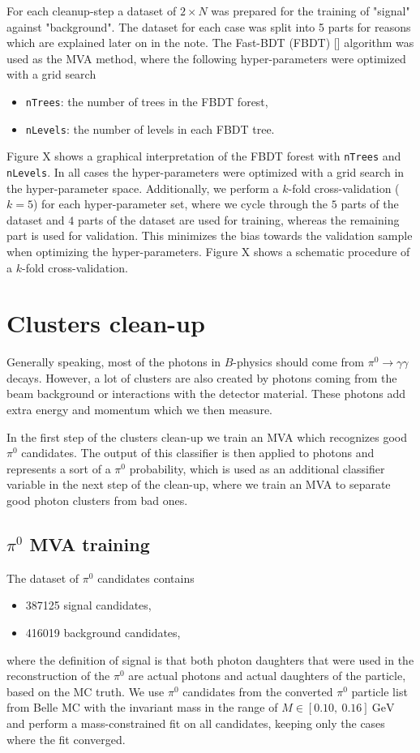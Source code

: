 \documentclass[oneside,a4paper,openany,12pt]{scrbook}
\newcommand {\e}[1]{\mathrm{~#1}}
\begin{document}
For each cleanup-step a dataset of $2\times N$ was prepared for the training of "signal" against "background". The dataset for each case was split into 5 parts for reasons which are explained later on in the note. The Fast-BDT (FBDT) [] algorithm was used as the MVA method, where the following hyper-parameters were optimized with a grid search
\begin{itemize}
\item \texttt{nTrees}: the number of trees in the FBDT forest,
\item \texttt{nLevels}: the number of levels in each FBDT tree.
\end{itemize}

Figure X shows a graphical interpretation of the FBDT forest with \texttt{nTrees} and \texttt{nLevels}. In all cases the hyper-parameters were optimized with a grid search in the hyper-parameter space. Additionally, we perform a $k$-fold cross-validation ($k=5$) for each hyper-parameter set, where we cycle through the $5$ parts of the dataset and $4$ parts of the dataset are used for training, whereas the remaining part is used for validation. This minimizes the bias towards the validation sample when optimizing the hyper-parameters. Figure X shows a schematic procedure of a $k$-fold cross-validation.

\section{Clusters clean-up}

Generally speaking, most of the photons in $B$-physics should come from $\pi^0 \to \gamma \gamma$ decays. However, a lot of clusters are also created by photons coming from the beam background or interactions with the detector material. These photons add extra energy and momentum which we then measure.

In the first step of the clusters clean-up we train an MVA which recognizes good $\pi^0$ candidates. The output of this classifier is then applied to photons and represents a sort of a $\pi^0$ probability, which is used as an additional classifier variable in the next step of the clean-up, where we train an MVA to separate good photon clusters from bad ones.

\subsection{$\pi^0$ MVA training}

The dataset of $\pi^0$ candidates contains
\begin{itemize}
\item 387125 signal candidates,
\item 416019 background candidates,
\end{itemize}
where the definition of signal is that both photon daughters that were used in the reconstruction of the $\pi^0$ are actual photons and actual daughters of the particle, based on the MC truth. We use $\pi^0$ candidates from the converted $\pi^0$ particle list from Belle MC with the invariant mass in the range of $M \in [0.10,~0.16]\e{GeV}$ and perform a mass-constrained fit on all candidates, keeping only the cases where the fit converged. 
\end{document}
